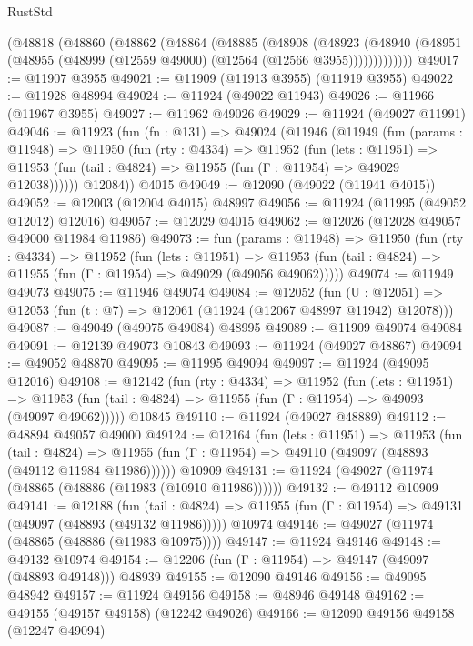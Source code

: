 \begin{lexlean}{RustStd}
\begin{coremodule}
    (@48818
      (@48860
        (@48862
          (@48864
            (@48885
              (@48908
                (@48923
                  (@48940 (@48951 (@48955 (@48999 (@12559 @49000) (@12564 (@12566 @3955)))))))))))))
@49017 := @11907 @3955
@49021 := @11909 (@11913 @3955) (@11919 @3955)
@49022 := @11928 @48994
@49024 := @11924 (@49022 @11943)
@49026 := @11966 (@11967 @3955)
@49027 := @11962 @49026
@49029 := @11924 (@49027 @11991)
@49046 := @11923
    (fun (fn : @131) =>
    @49024
      (@11946
        (@11949
          (fun (params : @11948) =>
          @11950
            (fun (rty : @4334) =>
            @11952
              (fun (lets : @11951) =>
              @11953 (fun (tail : @4824) => @11955 (fun (Γ : @11954) => @49029 @12038))))))
        @12084))
    @4015
@49049 := @12090 (@49022 (@11941 @4015))
@49052 := @12003 (@12004 @4015) @48997
@49056 := @11924 (@11995 (@49052 @12012) @12016)
@49057 := @12029 @4015
@49062 := @12026 (@12028 @49057 @49000 @11984 @11986)
@49073 := fun (params : @11948) =>
  @11950
    (fun (rty : @4334) =>
    @11952
      (fun (lets : @11951) =>
      @11953 (fun (tail : @4824) => @11955 (fun (Γ : @11954) => @49029 (@49056 @49062)))))
@49074 := @11949 @49073
@49075 := @11946 @49074
@49084 := @12052
    (fun (U : @12051) => @12053 (fun (t : @7) => @12061 (@11924 (@12067 @48997 @11942) @12078)))
@49087 := @49049 (@49075 @49084) @48995
@49089 := @11909 @49074 @49084
@49091 := @12139 @49073 @10843
@49093 := @11924 (@49027 @48867)
@49094 := @49052 @48870
@49095 := @11995 @49094
@49097 := @11924 (@49095 @12016)
@49108 := @12142
    (fun (rty : @4334) =>
    @11952
      (fun (lets : @11951) =>
      @11953 (fun (tail : @4824) => @11955 (fun (Γ : @11954) => @49093 (@49097 @49062)))))
    @10845
@49110 := @11924 (@49027 @48889)
@49112 := @48894 @49057 @49000
@49124 := @12164
    (fun (lets : @11951) =>
    @11953
      (fun (tail : @4824) =>
      @11955 (fun (Γ : @11954) => @49110 (@49097 (@48893 (@49112 @11984 @11986))))))
    @10909
@49131 := @11924 (@49027 (@11974 (@48865 (@48886 (@11983 (@10910 @11986))))))
@49132 := @49112 @10909
@49141 := @12188
    (fun (tail : @4824) => @11955 (fun (Γ : @11954) => @49131 (@49097 (@48893 (@49132 @11986)))))
    @10974
@49146 := @49027 (@11974 (@48865 (@48886 (@11983 @10975))))
@49147 := @11924 @49146
@49148 := @49132 @10974
@49154 := @12206 (fun (Γ : @11954) => @49147 (@49097 (@48893 @49148))) @48939
@49155 := @12090 @49146
@49156 := @49095 @48942
@49157 := @11924 @49156
@49158 := @48946 @49148
@49162 := @49155 (@49157 @49158) (@12242 @49026)
@49166 := @12090 @49156 @49158 (@12247 @49094)

\end{coremodule}
\end{lexlean}

